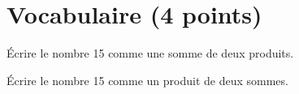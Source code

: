 \section{Vocabulaire (4 points)}

\begin{questions}
	\question[2] \'Ecrire le nombre 15 comme une somme de deux produits.
	
	\question[2] \'Ecrire le nombre 15 comme un produit de deux sommes.
\end{questions}